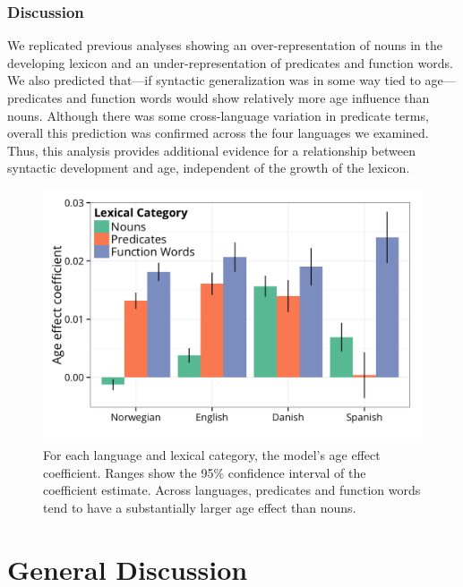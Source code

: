 \documentclass[10pt,letterpaper]{article}
\begin{document}
\subsubsection{Discussion}

We replicated previous analyses \cite{bates1994} showing an over-representation of nouns in the developing lexicon and an under-representation of predicates and function words. We also predicted that---if syntactic generalization was in some way tied to age---predicates and function words would show relatively more age influence than nouns. Although there was some cross-language variation in predicate terms, overall this prediction was confirmed across the four languages we examined. Thus, this analysis provides additional evidence for a relationship between syntactic development and age, independent of the growth of the lexicon.

\begin{figure}
\centering
\includegraphics[width=\linewidth]{plots/vocab_coef_plot-1.png}
\caption{\label{fig:coefs_vocab_comp} For each language and lexical category, the model's age effect coefficient. Ranges show the 95\% confidence interval of the coefficient estimate. Across languages, predicates and function words tend to have a substantially larger age effect than nouns.}
\end{figure}

\section{General Discussion}
\end{document}
